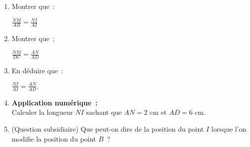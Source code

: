 \begin{enumerate}
     \item
     Montrer que~:
     \begin{center}
          $ \frac{ NM }{ AB } = \frac{ NI }{ AI }   $
     \end{center}
     \item
     Montrer que~:
     \begin{center}
          $ \frac{ NM }{ DC } = \frac{ AN }{ AD }   $
     \end{center}
     \item
     En déduire que~:
     \begin{center}
          $ \frac{ NI }{ AI } = \frac{ AN }{ AD }.$
     \end{center}
     \item  \textbf{Application numérique~: }
     \\
     Calculer la longueur $ NI $ sachant que $ AN = 2 $ cm et $ AD = 6 $ cm.
     \item
     (Question subsidiaire) Que peut-on dire de la position du point $I$ lorsque l'on modifie la position du point $B$~?
\end{enumerate}
